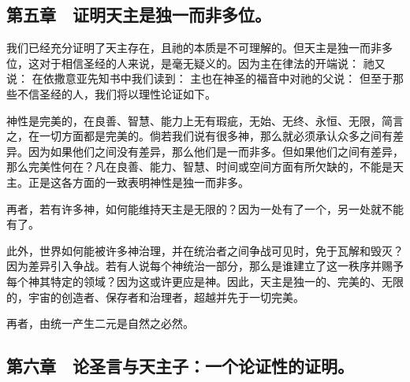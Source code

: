 
\subsection{第五章　证明天主是独一而非多位。}

我们已经充分证明了天主存在，且祂的本质是不可理解的。但天主是独一而非多位，这对于相信圣经的人来说，是毫无疑义的。因为主在律法的开端说： 祂又说： 在依撒意亚先知书中我们读到： 主也在神圣的福音中对祂的父说： 但至于那些不信圣经的人，我们将以理性论证如下。\par

神性是完美的，在良善、智慧、能力上无有瑕疵，无始、无终、永恒、无限，简言之，在一切方面都是完美的。倘若我们说有很多神，那么就必须承认众多之间有差异。因为如果他们之间没有差异，那么他们是一而非多。但如果他们之间有差异，那么完美性何在？凡在良善、能力、智慧、时间或空间方面有所欠缺的，不能是天主。正是这各方面的一致表明神性是独一而非多。\par

再者，若有许多神，如何能维持天主是无限的？因为一处有了一个，另一处就不能有了。\par

此外，世界如何能被许多神治理，并在统治者之间争战可见时，免于瓦解和毁灭？因为差异引入争战。若有人说每个神统治一部分，那么是谁建立了这一秩序并赐予每个神其特定的领域？因为这或许更应是神。因此，天主是独一的、完美的、无限的，宇宙的创造者、保存者和治理者，超越并先于一切完美。\par

再者，由统一产生二元是自然之必然。\par


\subsection{第六章　论圣言与天主子：一个论证性的证明。}

